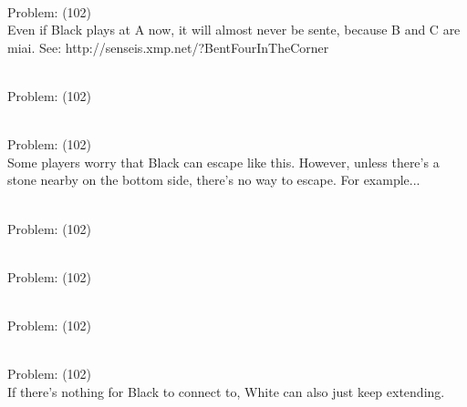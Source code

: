 \documentclass[11pt]{article}
\begin{document}
\begin{minipage}[t]{0.5\textwidth}
  {\centering
  
\\
Problem: (102)\\
Even if Black plays at A now, it will almost never be sente, because B and C are miai. See: http://senseis.xmp.net/?BentFourInTheCorner\\
  }
\end{minipage}
\begin{minipage}[t]{0.5\textwidth}
  {\centering
  
\\
Problem: (102)\\
  }
\end{minipage}
\begin{minipage}[t]{0.5\textwidth}
  {\centering
  
\\
Problem: (102)\\
Some players worry that Black can escape like this. However, unless there's a stone nearby on the bottom side, there's no way to escape. For example...\\
  }
\end{minipage}
\begin{minipage}[t]{0.5\textwidth}
  {\centering
  
\\
Problem: (102)\\
  }
\end{minipage}
\begin{minipage}[t]{0.5\textwidth}
  {\centering
  
\\
Problem: (102)\\
  }
\end{minipage}
\begin{minipage}[t]{0.5\textwidth}
  {\centering
  
\\
Problem: (102)\\
  }
\end{minipage}
\begin{minipage}[t]{0.5\textwidth}
  {\centering
  
\\
Problem: (102)\\
If there's nothing for Black to connect to, White can also just keep extending.\\
  }
\end{minipage}
\end{document}
